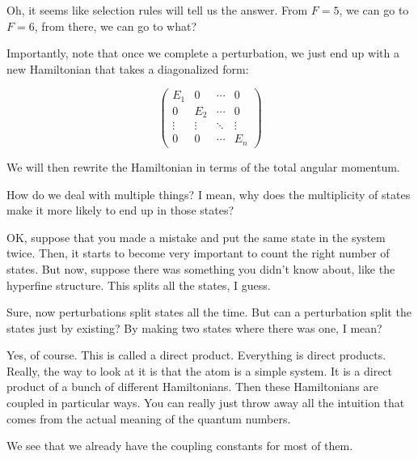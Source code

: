 Oh, it seems like selection rules will tell us the answer. From $F=5$, we can go to $F=6$, from there, we can go to what? 



Importantly, note that once we complete a perturbation, we just end up with a new Hamiltonian that takes a diagonalized form:

\begin{equation}
\begin{pmatrix}
E_1 & 0 & \cdots & 0 \\
0   & E_2 & \cdots & 0\\
\vdots&\vdots&\ddots & \vdots\\
0 & 0 & \cdots & E_n
\end{pmatrix}
\end{equation}

We will then rewrite the Hamiltonian in terms of the total angular momentum. 

How do we deal with multiple things? I mean, why does the multiplicity of states make it more likely to end up in those states? 

OK, suppose that you made a mistake and put the same state in the system twice. Then, it starts to become very important to count the right number of states. But now, suppose there was something you didn't know about, like the hyperfine structure. This splits all the states, I guess. 

Sure, now perturbations split states all the time. But can a perturbation split the states just by existing? By making two states where there was one, I mean? 

Yes, of course. This is called a direct product. Everything is direct products. Really, the way to look at it is that the atom is a simple system. It is a direct product of a bunch of different Hamiltonians. Then these Hamiltonians are coupled in particular ways. You can really just throw away all the intuition that comes from the actual meaning of the quantum numbers. 


We see that we already have the coupling constants for most of them. %

